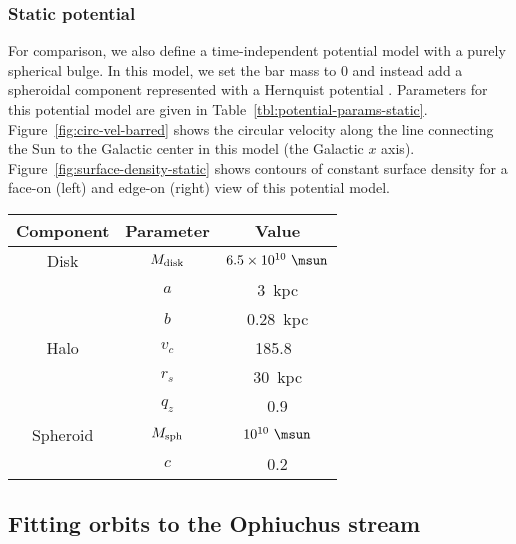 \documentclass[letterpaper,12pt,preprint]{aastex}
\begin{document}
\subsubsection{Static potential}

For comparison, we also define a time-independent potential model with a purely spherical bulge. In this model, we set the bar mass to 0 and instead add a spheroidal component represented with a Hernquist potential \citep{hernquist90}. Parameters for this potential model are given in Table~\ref{tbl:potential-params-static}. Figure~\ref{fig:circ-vel-barred} shows the circular velocity along the line connecting the Sun to the Galactic center in this model (the Galactic $x$ axis). Figure~\ref{fig:surface-density-static} shows contours of constant surface density for a face-on (left) and edge-on (right) view of this potential model.

\begin{table*}[ht]
\begin{center}
	\begin{tabular}{ c | c | c }
	         \toprule
	         Component & Parameter & Value \\\toprule
		Disk & $M_{\rm disk}$ & $6.5 \times 10^{10}~\msun$ \\
		& $a$ & 3~{\rm kpc}\\
		& $b$ & 0.28~{\rm kpc} \\\midrule
	         Halo & $v_c$ & 185.8~\kms\\
		& $r_s$ & 30~kpc \\
		& $q_z$ & 0.9 \\\midrule
		Spheroid & $M_{\rm sph}$ & $10^{10}~\msun$ \\
		& $c$ & 0.2 \\
		\bottomrule
		\end{tabular}
	\caption{Same as Table~\ref{tbl:potential-params-barred}, except: the disk mass is increased to account for removing the bar component, a spheroidal bulge component is added. \label{tbl:potential-params-static}}
\end{center}
\end{table*}

\subsection{Fitting orbits to the Ophiuchus stream}\label{sec:orbit-fit}
\end{document}
